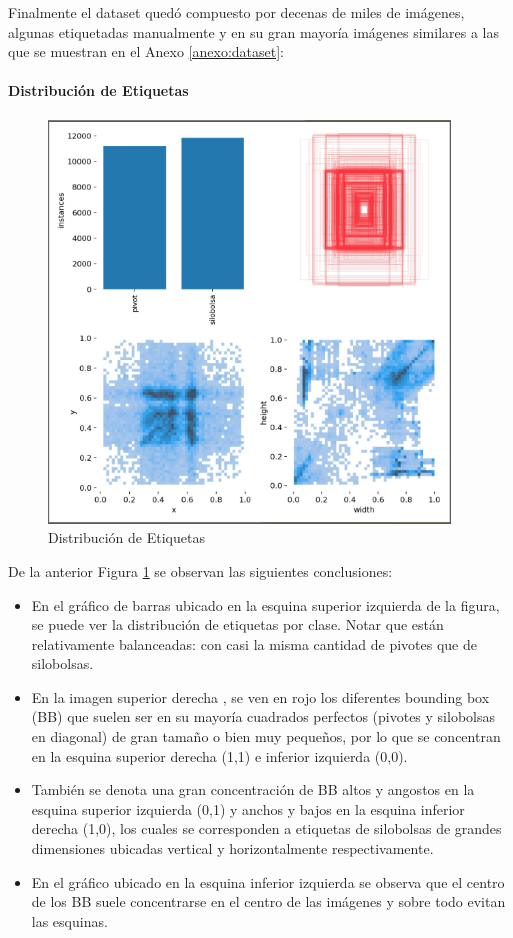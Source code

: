 Finalmente el dataset quedó compuesto por decenas de miles de imágenes, algunas etiquetadas manualmente y en su gran mayoría imágenes similares a las que se muestran en el Anexo \ref{anexo:dataset}:

\newpage
\paragraph{Distribución de Etiquetas}
\begin{figure}[h!]
    \centering
    \includegraphics[width=0.95\textwidth]{img/distribucion de etiquetas.png}
    \caption{Distribución de Etiquetas}
    \label{fig:distribucion de etiquetas}
\end{figure}

De la anterior Figura \ref{fig:distribucion de etiquetas} se observan las siguientes conclusiones:
\begin{itemize}
    \item En el gráfico de barras ubicado en la esquina superior izquierda de la figura, se puede ver la distribución de etiquetas por clase. Notar que están relativamente balanceadas: con casi la misma cantidad de pivotes que de silobolsas.
    \item En la imagen superior derecha , se ven en rojo los diferentes bounding box (BB) que suelen ser en su mayoría cuadrados perfectos (pivotes y silobolsas en diagonal) de gran tamaño o bien muy pequeños, por lo que se concentran en la esquina superior derecha (1,1) e inferior izquierda (0,0).
    \item También se denota una gran concentración de BB altos y angostos  en la esquina superior izquierda (0,1) y anchos y bajos en la esquina inferior derecha (1,0), los cuales se corresponden a etiquetas de silobolsas de grandes dimensiones ubicadas vertical y horizontalmente respectivamente.
    \item En el gráfico ubicado en la esquina inferior izquierda se observa que el centro de los BB suele concentrarse en el centro de las imágenes y sobre todo evitan las esquinas.
\end{itemize}

